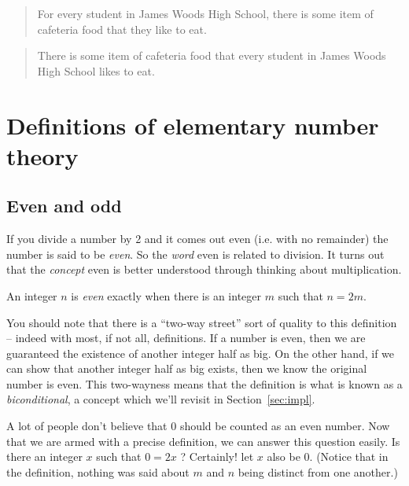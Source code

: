 \begin{quote}
For every student in James Woods High School, there is some item of
cafeteria food that they like to eat.
\end{quote}

\begin{quote}
There is some item of cafeteria food that every student in James Woods 
High School likes to eat.
\end{quote}

\newpage





\newpage

\section{Definitions of elementary number theory}
\label{sec:num_thry}

\subsection{Even and odd}
\label{even_n_odd}

If you divide a number by 2 and it comes out even (i.e. with
no remainder) the number is said to be {\em even}.  So the 
{\em word} even is related to division.  It turns out that the
{\em concept} even is better understood through thinking about
multiplication.

\begin{defi}
An integer $n$ is {\em even} exactly when there is an integer $m$
such that $n = 2m$.
\end{defi}

You should note that there is a ``two-way street'' sort of quality
to this definition -- indeed with most, if not all, definitions.  If 
a number is even, then we are guaranteed the existence of another
integer half as big.  On the other hand, if we can show that another
integer half as big exists, then we know the original number is even.
This two-wayness means that the definition is what is known as a 
{\em biconditional}, a concept which we'll revisit in
Section~\ref{sec:impl}.  

A lot of people don't believe that $0$ should be counted as an even
number.  Now that we are armed with a precise definition, we can
answer this question easily.  Is there an integer $x$ such that
$0 = 2x$ ?  Certainly! let $x$ also be $0$.  (Notice that in the
definition, nothing was said about $m$ and $n$ being distinct from
one another.)  

